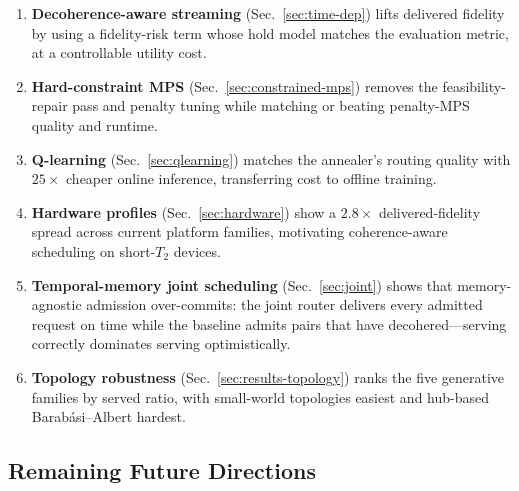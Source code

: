 \documentclass[10pt,a4paper]{article}
\begin{document}
\begin{enumerate}
  \item \textbf{Decoherence-aware streaming} (Sec.~\ref{sec:time-dep})
    lifts delivered fidelity by using a fidelity-risk term whose hold
    model matches the evaluation metric, at a controllable utility
    cost.
  \item \textbf{Hard-constraint MPS} (Sec.~\ref{sec:constrained-mps})
    removes the feasibility-repair pass and penalty tuning while
    matching or beating penalty-MPS quality and runtime.
  \item \textbf{Q-learning} (Sec.~\ref{sec:qlearning}) matches the
    annealer's routing quality with $25\times$ cheaper online
    inference, transferring cost to offline training.
  \item \textbf{Hardware profiles} (Sec.~\ref{sec:hardware}) show a
    $2.8\times$ delivered-fidelity spread across current platform
    families, motivating coherence-aware scheduling on
    short-$T_2$ devices.
  \item \textbf{Temporal-memory joint scheduling} (Sec.~\ref{sec:joint})
    shows that memory-agnostic admission over-commits: the joint router
    delivers every admitted request on time while the baseline admits
    pairs that have decohered---serving correctly dominates serving
    optimistically.
  \item \textbf{Topology robustness} (Sec.~\ref{sec:results-topology})
    ranks the five generative families by served ratio, with
    small-world topologies easiest and hub-based Barab\'asi--Albert
    hardest.
\end{enumerate}

\subsection{Remaining Future Directions}
\end{document}
